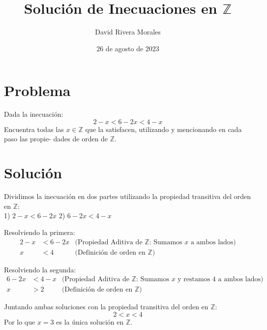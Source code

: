 \documentclass[12pt]{article}
\begin{document}
\title{Solución de Inecuaciones en \( \mathbb{Z} \)}
\author{David Rivera Morales}
\date{26 de agosto de 2023}

\maketitle

\section*{Problema}
Dada la inecuación:
\[
2 - x < 6 - 2x < 4 - x
\]
Encuentra todas las \( x \in \mathbb{Z} \) que la satisfacen, utilizando y mencionando en cada paso las propie-
dades de orden de \( \mathbb{Z} \).

\section*{Solución}
Dividimos la inecuación en dos partes utilizando la propiedad transitiva del orden en \( \mathbb{Z} \): \\
1) \(2 - x < 6 - 2x\)
2) \(6 - 2x < 4 - x\)

Resolviendo la primera:
\begin{align*}
2 - x &< 6 - 2x & \text{(Propiedad Aditiva de } \mathbb{Z} \text{: Sumamos } x \text{ a ambos lados)} \\
x &< 4 & \text{(Definición de orden en } \mathbb{Z} \text{)}
\end{align*}

Resolviendo la segunda:
\begin{align*}
6 - 2x &< 4 - x & \text{(Propiedad Aditiva de } \mathbb{Z} \text{: Sumamos } x \text{ y restamos 4 a ambos lados)} \\
x &> 2 & \text{(Definición de orden en } \mathbb{Z} \text{)}
\end{align*}

Juntando ambas soluciones con la propiedad transitiva del orden en \( \mathbb{Z} \):
\[
2 < x < 4
\]
Por lo que \(x = 3\) es la única solución en \(\mathbb{Z}\).
\end{document}
